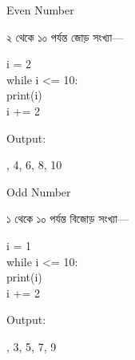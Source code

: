 \noindent
\begin{minipage}[t]{0.49\linewidth}

\begin{sideexamplebox}{Even Number}

২ থেকে ১০ পর্যন্ত জোড় সংখ্যা—

\begin{sidecodebox}
\begin{english}
\ttfamily
i = 2\\
while i <= 10:\\
\hspace*{4mm}print(i)\\
\hspace*{4mm}i += 2
\end{english}
\end{sidecodebox}

Output:

\begin{center}
\textenglish{, 4, 6, 8, 10}
\end{center}

\end{sideexamplebox}

\end{minipage}
\hfill
\begin{minipage}[t]{0.49\linewidth}

\begin{sideexamplebox}{Odd Number}

১ থেকে ১০ পর্যন্ত বিজোড় সংখ্যা—

\begin{sidecodebox}
\begin{english}
\ttfamily
i = 1\\
while i <= 10:\\
\hspace*{4mm}print(i)\\
\hspace*{4mm}i += 2
\end{english}
\end{sidecodebox}

Output:

\begin{center}
\textenglish{, 3, 5, 7, 9}
\end{center}

\end{sideexamplebox}

\end{minipage}

